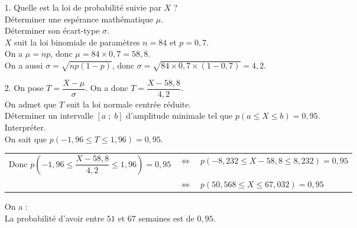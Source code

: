 \begin{itemize}
\item[1.] Quelle est la loi de probabilité suivie par $X$ ? \\
Déterminer une espérance mathématique $\mu$. \\ Déterminer son écart-type $\sigma$. \\

$X$ suit la loi binomiale de paramètres $n = 84$ et $p = 0,7$. \\

On a $\mu = np$, donc $\mu = 84 \times 0,7 = 58,8$. \\
On a aussi $\sigma = \sqrt{np\left(1-p\right)}$, donc $\sigma = \sqrt{84 \times 0,7 \times \left(1-0,7\right)} = 4,2$.

\item[2.] On pose $T = \dfrac{X - \mu}{\sigma}$. On a donc $T = \dfrac{X - 58,8}{4,2}$. \\

On admet que $T$ suit la loi normale centrée réduite. \\

Déterminer un intervalle $\left[a \; ; \; b\right]$ d'amplitude minimale tel que $p\left(a \leqslant X \leqslant b\right) = 0,95$. \\ Interpréter. \\

On sait que $p\left(-1,96 \leqslant T \leqslant 1,96 \right) = 0,95$. \\

\begin{tabular}{lll}
\hspace{-.3cm} Donc $p\left(-1,96 \leqslant \dfrac{X-58,8}{4,2} \leqslant 1,96\right) = 0,95$ & $\Longleftrightarrow$ & $p\left(-8,232 \leqslant X - 58,8 \leqslant 8,232\right) = 0,95$ \vspace*{.3cm} \\
& $\Longleftrightarrow$ & $p\left(50,568 \leqslant X \leqslant 67,032\right) = 0,95$ \\
\end{tabular}

\vspace*{.3cm}

On a : \\

La probabilité d'avoir entre $51$ et $67$ semaines est de $0,95$.

\end{itemize}


\newpage

